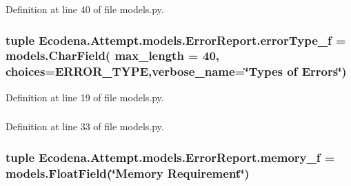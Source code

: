Definition at line 40 of file models.py.

\hypertarget{class_ecodena_1_1_attempt_1_1models_1_1_error_report_a2206247ced5f221ac3622b203c27d98a}{
\subsubsection[{errorType\_\-f}]{\setlength{\rightskip}{0pt plus 5cm}tuple {\bf Ecodena.Attempt.models.ErrorReport.errorType\_\-f} = models.CharField( max\_\-length = 40, choices={\bf ERROR\_\-TYPE},verbose\_\-name=\char`\"{}Types of Errors\char`\"{})}}
\label{df/d02/class_ecodena_1_1_attempt_1_1models_1_1_error_report_a2206247ced5f221ac3622b203c27d98a}


Definition at line 19 of file models.py.

\hypertarget{class_ecodena_1_1_attempt_1_1models_1_1_error_report_a858275b05dc21b8b755b3b393ad38fb7}{
\subsubsection[{memory\_\-f}]{}}
\label{df/d02/class_ecodena_1_1_attempt_1_1models_1_1_error_report_a858275b05dc21b8b755b3b393ad38fb7}


Definition at line 33 of file models.py.

\hypertarget{class_ecodena_1_1_attempt_1_1models_1_1_error_report_a6251188760c30f622c68f126ba37c765}{
\subsubsection[{memory\_\-f}]{\setlength{\rightskip}{0pt plus 5cm}tuple {\bf Ecodena.Attempt.models.ErrorReport.memory\_\-f} = models.FloatField(\char`\"{}Memory Requirement\char`\"{})}}
\label{df/d02/class_ecodena_1_1_attempt_1_1models_1_1_error_report_a6251188760c30f622c68f126ba37c765}


